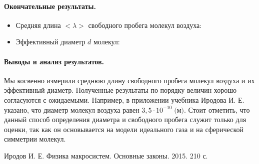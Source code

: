 \documentclass{article}
\begin{document}
	\paragraph{Окончательные результаты.}
	\begin{itemize}
		\item Средняя длина $<\lambda>$ свободного пробега молекул воздуха:
		\begin{center}
		\end{center}
		
		\item Эффективный диаметр $d$ молекул:
		\begin{center}
		\end{center}
		
	\end{itemize}
	
	\paragraph{Выводы и анализ результатов.}
	Мы косвенно измерили среднюю длину свободного пробега молекул воздуха и их эффективный диаметр. Полученные результаты по порядку величин хорошо согласуются с ожидаемыми. Например, в приложении учебника Иродова И. Е.~\cite{1} указано, что диаметр молекул воздуха  равен $3,5\cdot10^{-10}\; \mbox{(м)}$. Стоит отметить, что данный способ определения диаметра и свободного пробега служит только для оценки, так как он основывается на модели идеального газа и на сферической симметрии молекул.
	
	\begin{thebibliography}{3}
		Иродов И. Е. Физика макросистем. Основные законы. 2015. 210 с.
	\end{thebibliography}
\end{document}
